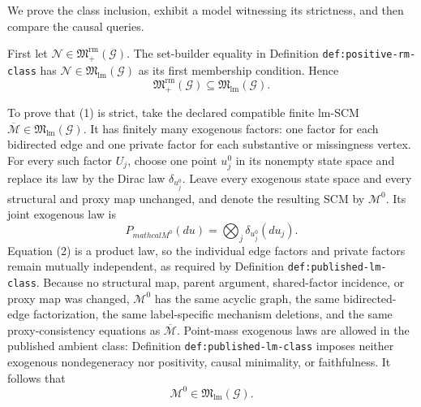 We prove the class inclusion, exhibit a model witnessing its strictness, and then compare the causal queries.

First let \(\mathcal N\in\mathfrak M_{+}^{\mathrm{rm}}(\mathcal G)\).  The set-builder equality in Definition \texttt{def:positive-rm-class} has \(\mathcal N\in\mathfrak M_{\mathrm{lm}}(\mathcal G)\) as its first membership condition.  Hence
\[
\mathfrak M_{+}^{\mathrm{rm}}(\mathcal G)
\subseteq
\mathfrak M_{\mathrm{lm}}(\mathcal G).
\tag{1}
\]

To prove that (1) is strict, take the declared compatible finite lm-SCM \(\overline{\mathcal M}\in\mathfrak M_{\mathrm{lm}}(\mathcal G)\).  It has finitely many exogenous factors: one factor for each bidirected edge and one private factor for each substantive or missingness vertex.  For every such factor \(U_j\), choose one point \(u_j^0\) in its nonempty state space and replace its law by the Dirac law \(\delta_{u_j^0}\).  Leave every exogenous state space and every structural and proxy map unchanged, and denote the resulting SCM by \(\mathcal M^0\).  Its joint exogenous law is
\[
P_{mathcal M^0}(d u)=\bigotimes_j\delta_{u_j^0}(d u_j).
\tag{2}
\]
Equation (2) is a product law, so the individual edge factors and private factors remain mutually independent, as required by Definition \texttt{def:published-lm-class}.  Because no structural map, parent argument, shared-factor incidence, or proxy map was changed, \(\mathcal M^0\) has the same acyclic graph, the same bidirected-edge factorization, the same label-specific mechanism deletions, and the same proxy-consistency equations as \(\overline{\mathcal M}\).  Point-mass exogenous laws are allowed in the published ambient class: Definition \texttt{def:published-lm-class} imposes neither exogenous nondegeneracy nor positivity, causal minimality, or faithfulness.  It follows that
\[
\mathcal M^0\in\mathfrak M_{\mathrm{lm}}(\mathcal G).
\tag{3}
\]

